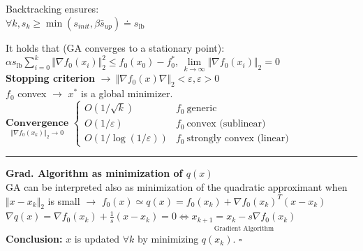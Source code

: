 \documentclass[a4paper]{article}
\begin{document}
\begin{multicols}{2}
\begin{multicols}{2}
        \noindent
        Backtracking ensures:\\
        {\small $\forall{k}, s_k\!\ge\!\min(s_{init}, \beta\bar{s}_{up})\doteq{s_{\text{lb}}}$}
    \end{multicols} 
    \vspace{-0.6cm}
    \noindent
    It holds that (GA converges to a stationary point):\\
    $\alpha{s_{\text{lb}}}\sum_{i=0}^k {\Vert \nabla{f_0}(x_i) \Vert_2^2} \le f_0(x_0)-f_0^*$,  
    $\underset{k\to\infty}{\lim}{\Vert \nabla{f_0}(x_i) \Vert_2}=0$\\
    \textbf{Stopping criterion} $\to \ \Vert \nabla{f_0}(x)\nabla \Vert_2 < \varepsilon, \varepsilon>0$\\
    $f_0$ convex $\to$ $x^*$ is a global minimizer.\\
    $\underset{\Vert \nabla{f_0(x_k)} \Vert_2 \to 0}{\textbf{Convergence}}$ $\begin{cases}
        O(1/\sqrt{k})&f_0 \ \text{generic}\\
        O(1/\varepsilon)&f_0 \ \text{convex (sublinear)}\\
        O(1/\log(1/\varepsilon))&f_0 \ \text{strongly convex (linear)}
    \end{cases}$\\
    \hrule\noindent
    \textsf{\textbf{Grad. Algorithm as minimization of $q(x)$}}\\
    GA can be interpreted also as minimization of the quadratic approximant when $\Vert x-x_k \Vert_2$ is small $\to$ $f_0(x)\simeq{q(x)=f_0(x_k) + \nabla{f_0(x_k)}^T(x-x_k)}$\\
    $\nabla{q(x)}\!=\!\nabla{f_0(x_k)}+\frac{1}{s}(x-x_k)=0 \Leftrightarrow\underset{\text{Gradient Algorithm}}{x_{k+1}=x_k-s\nabla{f_0(x_k)}}$\\
    \textbf{Conclusion:} $x$ is updated $\forall{k}$ by minimizing $q(x_k)$. $\square$
 \end{multicols}
\vspace{-0.8cm}
\end{document}
